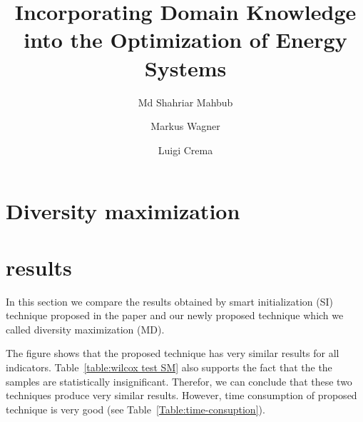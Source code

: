 \documentclass[review]{elsarticle}
\theoremstyle{definition}
\begin{document}
\begin{frontmatter}



\title{Incorporating Domain Knowledge into the Optimization of Energy Systems}


\author[FBK,Unitn]{Md Shahriar Mahbub}
\author[Adl]{Markus Wagner}
\author[FBK]{Luigi Crema}

\address[FBK]{Fondazione Bruno Kessler, Via Sommarive 18, 38123 Povo, Trento, Italy.}
\address[Unitn]{University of Trento, Via Sommarive 9, 38123 Povo, Trento, Italy.}
\address[Adl]{University of Adelaide, Adelaide, SA 5005, Australia.}

\end{frontmatter}

\section{Diversity maximization}

\section{results}
In this section we compare the results obtained by smart initialization (SI) technique proposed in the paper and our newly proposed technique which we called diversity maximization (MD).

The figure shows that the proposed technique has very similar results for all indicators. Table~\ref{table:wilcox test SM} also supports the fact that the the samples are statistically insignificant. Therefor, we can conclude that these two techniques produce very similar results. However, time consumption of proposed technique is very good (see Table~\ref{Table:time-consuption}). 
\end{document}

